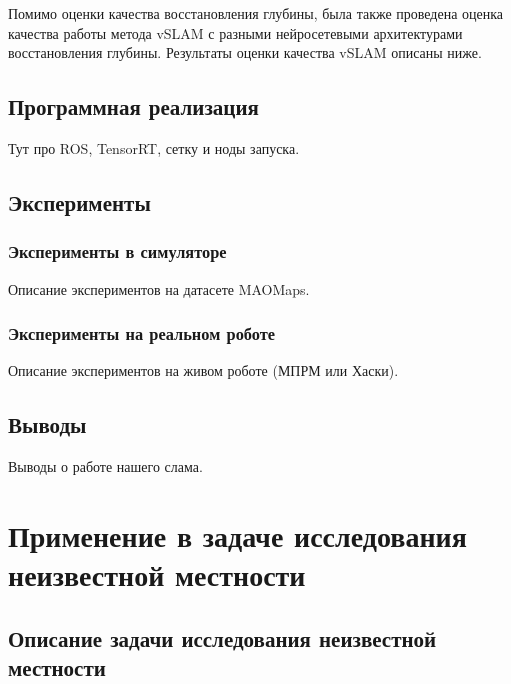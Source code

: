 \documentclass{mipt-thesis-ms}
\begin{document}
	Помимо оценки качества восстановления глубины, была также проведена оценка качества работы метода vSLAM с разными нейросетевыми архитектурами восстановления глубины. Результаты оценки качества vSLAM описаны ниже.
	
	\section{Программная реализация}
	
	Тут про ROS, TensorRT, сетку и ноды запуска.
	
	\section{Эксперименты}
	
	\subsection{Эксперименты в симуляторе}
	\label{section_experiments}
	
	Описание экспериментов на датасете MAOMaps.
	
	\subsection{Эксперименты на реальном роботе}
	
	Описание экспериментов на живом роботе (МПРМ или Хаски).
	
	\section{Выводы}
	
	Выводы о работе нашего слама.
	
	
	\chapter{Применение в задаче исследования неизвестной местности}
	
	\section{Описание задачи исследования неизвестной местности}
	
\end{document}
